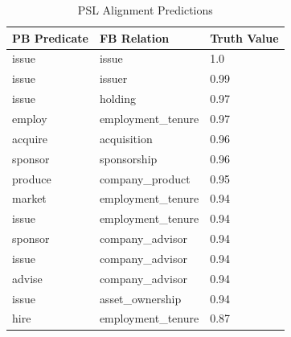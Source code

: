 \begin{table} [ht]
\begin{center}
\small{
\begin{tabular}{p{3cm}p{3cm}p{2cm}}
\noalign{\smallskip}
\hline
PB Predicate & FB Relation & Truth Value\\	
\hline
issue & issue & 1.0 \\
issue &issuer & 0.99  \\
issue & holding & 0.97\\
employ	& employment\_tenure	& 0.97\\
acquire	&acquisition	& 0.96\\
sponsor	&sponsorship&	 0.96\\
produce	&company\_product&	0.95\\
market	&employment\_tenure &	0.94\\
issue	&employment\_tenure &	0.94\\
sponsor & company\_advisor & 0.94\\
issue & company\_advisor & 0.94\\
advise & company\_advisor & 0.94\\
issue & asset\_ownership & 0.94\\
hire & employment\_tenure & 0.87\\

\hline
\end{tabular}
}
\caption{PSL Alignment Predictions}
\vspace{-0.4cm}
\end{center}
\end{table}




